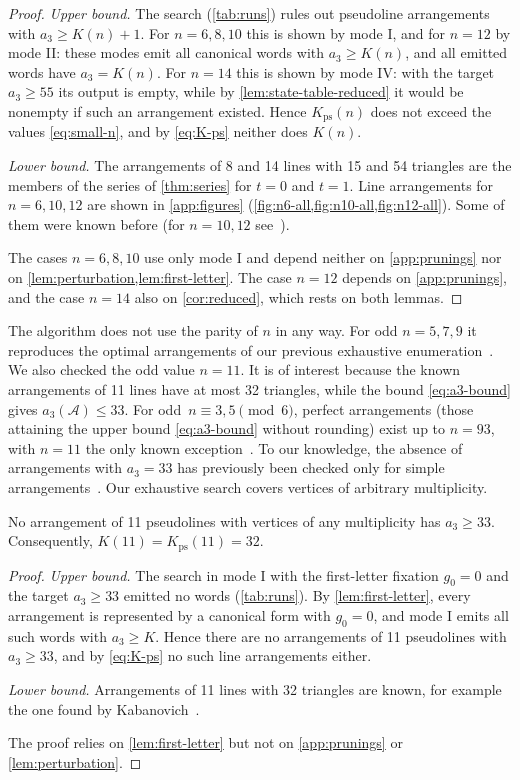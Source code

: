 \begin{proof}
\emph{Upper bound.} The search (\cref{tab:runs}) rules out pseudoline arrangements with $a_3\ge K(n)+1$.
For $n=6,8,10$ this is shown by mode I, and for $n=12$ by mode II: these modes emit all canonical words with $a_3\ge K(n)$, and all emitted words have $a_3=K(n)$.
For $n=14$ this is shown by mode IV: with the target $a_3\ge55$ its output is empty, while by \cref{lem:state-table-reduced} it would be nonempty if such an arrangement existed.
Hence $K_{\mathrm{ps}}(n)$ does not exceed the values \eqref{eq:small-n}, and by \eqref{eq:K-ps} neither does $K(n)$.

\emph{Lower bound.} The arrangements of 8 and 14 lines with 15 and 54 triangles are the members of the series of \cref{thm:series} for $t=0$ and $t=1$.
Line arrangements for $n=6,10,12$ are shown in \cref{app:figures} (\cref{fig:n6-all,fig:n10-all,fig:n12-all}). Some of them were known before (for $n=10,12$ see~\cite{khodulev99}).

The cases $n=6,8,10$ use only mode I and depend neither on \cref{app:prunings} nor on \cref{lem:perturbation,lem:first-letter}. The case $n=12$ depends on \cref{app:prunings}, and the case $n=14$ also on \cref{cor:reduced}, which rests on both lemmas.
\end{proof}

The algorithm does not use the parity of $n$ in any way.
For odd $n=5,7,9$ it reproduces the optimal arrangements of our previous exhaustive enumeration~\cite[Section~7]{pu26b}.
We also checked the odd value $n=11$.
It is of interest because the known arrangements of 11 lines have at most 32 triangles, while the bound \eqref{eq:a3-bound} gives $a_3(\mathcal A)\leq33$.
For odd~$n\equiv3,5\pmod 6$, perfect arrangements (those attaining the upper bound \eqref{eq:a3-bound} without rounding) exist up to $n=93$, with $n=11$ the only known exception~\cite[Tables~1 and~4]{pu26b}.
To our knowledge, the absence of arrangements with $a_3=33$ has previously been checked only for simple arrangements~\cite{blanc11,savchuk25}.
Our exhaustive search covers vertices of arbitrary multiplicity.

\begin{theorem}\label{thm:n11}
No arrangement of 11 pseudolines with vertices of any multiplicity has $a_3\ge33$. Consequently, $K(11)=K_{\mathrm{ps}}(11)=32$.
\end{theorem}

\begin{proof}
\emph{Upper bound.} The search in mode I with the first-letter fixation $g_0=0$ and the target $a_3\ge33$ emitted no words (\cref{tab:runs}).
By \cref{lem:first-letter}, every arrangement is represented by a canonical form with $g_0=0$, and mode I emits all such words with $a_3\ge K$.
Hence there are no arrangements of 11 pseudolines with $a_3\ge33$, and by \eqref{eq:K-ps} no such line arrangements either.

\emph{Lower bound.} Arrangements of 11 lines with 32 triangles are known, for example the one found by Kabanovich~\cite{khodulev99}.

The proof relies on \cref{lem:first-letter} but not on \cref{app:prunings} or \cref{lem:perturbation}.
\end{proof}

